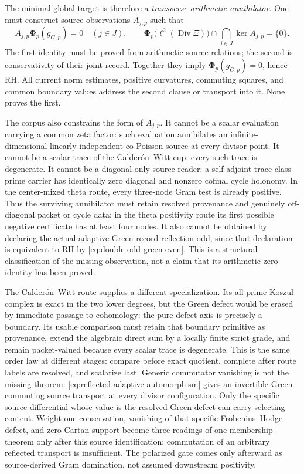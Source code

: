 \documentclass[11pt]{article}
\theoremstyle{definition}
\theoremstyle{remark}
\newcommand{\Div}{\operatorname{Div}}
\begin{document}
The minimal global target is therefore a \emph{transverse arithmetic
annihilator}.  One must construct source observations \(A_{j,p}\) such that
\[
 A_{j,p}\boldsymbol\Phi_p(g_{G,p})=0\quad(j\in J),\qquad
 \boldsymbol\Phi_p\bigl(\ell^2(\Div\Xi)\bigr)
       \cap\bigcap_{j\in J}\ker A_{j,p}=\{0\}.
\tag{7.17i}\label{eq:transverse-arithmetic-annihilator}
\]
The first identity must be proved from arithmetic source relations; the
second is conservativity of their joint record.  Together they imply
\(\boldsymbol\Phi_p(g_{G,p})=0\), hence RH.  All current norm estimates,
positive curvatures, commuting squares, and common boundary values address
the second clause or transport into it.  None proves the first.

The corpus also constrains the form of \(A_{j,p}\).  It cannot be a scalar
evaluation carrying a common zeta factor: such evaluation annihilates an
infinite-dimensional linearly independent co-Poisson source at every divisor
point.  It cannot be a scalar trace of the Calder\'on--Witt cup: every such
trace is degenerate.  It cannot be a diagonal-only source reader: a
self-adjoint trace-class prime carrier has identically zero diagonal and
nonzero cofinal cycle holonomy.  In the center-mixed theta route, every
three-node Gram test is already positive.  Thus the surviving annihilator
must retain resolved provenance and genuinely off-diagonal packet or cycle
data; in the theta positivity route its first possible negative certificate
has at least four nodes.  It also cannot be obtained by declaring the actual
adaptive Green record reflection-odd, since that declaration is equivalent
to RH by \eqref{eq:double-odd-green-even}.  This is a structural classification of the missing
observation, not a claim that its arithmetic zero identity has been proved.

The Calder\'on--Witt route supplies a different specialization.  Its
all-prime Koszul complex is exact in the two lower degrees, but the Green
defect would be erased by immediate passage to cohomology: the pure defect
axis is precisely a boundary.  Its usable comparison must retain that
boundary primitive as provenance, extend the algebraic direct sum by a
locally finite strict grade, and remain packet-valued because every scalar
trace is degenerate.  This is the same order law at different stages:
compare before exact quotient, complete after route labels are resolved,
and scalarize last.
Generic commutator vanishing is not the missing theorem:
\eqref{eq:reflected-adaptive-automorphism} gives an invertible
Green-commuting source transport at every divisor configuration.  Only the
specific source differential whose value is the resolved Green defect can
carry selecting content.  Weight-one conservation, vanishing of that
specific Frobenius--Hodge defect, and zero-Cartan support become three
readings of one membership theorem only after this source identification;
commutation of an arbitrary reflected transport is insufficient.
The polarized gate comes only afterward as source-derived Gram domination,
not assumed downstream positivity.
\end{document}
